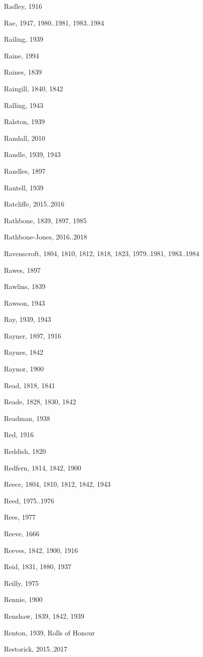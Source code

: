 {\begin{theindex}
\item Radley, 1916
\item Rae, 1947, 1980..1981, 1983..1984
\item Railing, 1939
\item Raine, 1994
\item Raines, 1839
\item Raingill, 1840, 1842
\item Ralling, 1943
\item Ralston, 1939
\item Randall, 2010
\item Randle, 1939, 1943
\item Randles, 1897
\item Rantell, 1939
\item Ratcliffe, 2015..2016
\item Rathbone, 1839, 1897, 1985
\item Rathbone-Jones, 2016..2018
\item Ravenscroft, 1804, 1810, 1812, 1818, 1823, 1979..1981, 1983..1984
\item Rawes, 1897
\item Rawlins, 1839
\item Rawson, 1943
\item Ray, 1939, 1943
\item Rayner, 1897, 1916
\item Raynes, 1842
\item Raynor, 1900
\item Read, 1818, 1841
\item Reade, 1828, 1830, 1842
\item Readman, 1938
\item Red, 1916
\item Reddish, 1820
\item Redfern, 1814, 1842, 1900
\item Reece, 1804, 1810, 1812, 1842, 1943
\item Reed, 1975..1976
\item Rees, 1977
\item Reeve, 1666
\item Reeves, 1842, 1900, 1916
\item Reid, 1831, 1880, 1937
\item Reilly, 1975
\item Rennie, 1900
\item Renshaw, 1839, 1842, 1939
\item Renton, 1939, Rolls of Honour
\item Restorick, 2015..2017

\end{theindex}}

